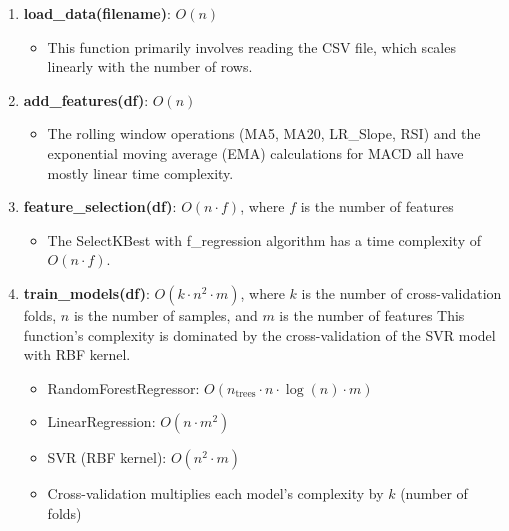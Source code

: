 \documentclass[11pt,a4paper]{article}
\begin{document}
\begin{enumerate}
    \item \textbf{load\_data(filename)}: $O(n)$
    \begin{itemize}
        \item This function primarily involves reading the CSV file, which scales linearly with the number of rows.
    \end{itemize}
    
    \item \textbf{add\_features(df)}: $O(n)$
    \begin{itemize}
        \item The rolling window operations (MA5, MA20, LR\_Slope, RSI) and the exponential moving average (EMA) calculations for MACD all have mostly linear time complexity.
    \end{itemize}
    
    \item \textbf{feature\_selection(df)}: $O(n \cdot f)$, where $f$ is the number of features
    \begin{itemize}
        \item The SelectKBest with f\_regression algorithm has a time complexity of $O(n \cdot f)$.
    \end{itemize}
    
    \item \textbf{train\_models(df)}: $O(k \cdot n^2 \cdot m)$, where $k$ is the number of cross-validation folds, $n$ is the number of samples, and $m$ is the number of features
    This function's complexity is dominated by the cross-validation of the SVR model with RBF kernel.
    \begin{itemize}
        \item RandomForestRegressor: $O(n_{\text{trees}} \cdot n \cdot \log(n) \cdot m)$
        \item LinearRegression: $O(n \cdot m^2)$
        \item SVR (RBF kernel): $O(n^2 \cdot m)$
        \item Cross-validation multiplies each model's complexity by $k$ (number of folds)
    \end{itemize}


\end{enumerate}
\end{document}
